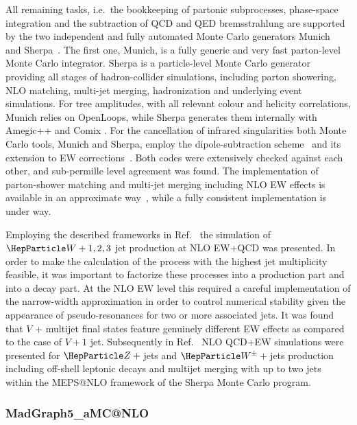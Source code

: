 \documentclass[11pt]{cernrep}
\begin{document}
All remaining tasks, i.e.\ the bookkeeping of partonic subprocesses,
phase-space integration and the subtraction of QCD and QED
bremsstrahlung are supported by the two independent and fully
automated Monte Carlo generators {\sc Munich}~\cite{munich} and {\sc
  Sherpa}~\cite{Gleisberg:2007md,Gleisberg:2008ta}.  The first one,
{\sc Munich}, is a fully generic and very fast parton-level Monte
Carlo integrator. {\sc Sherpa} is a particle-level Monte Carlo
generator providing all stages of hadron-collider simulations,
including parton showering, NLO matching, multi-jet merging,
hadronization and underlying event simulations.  For tree amplitudes,
with all relevant colour and helicity correlations, {\sc Munich}
relies on {\sc OpenLoops}, while {\sc Sherpa} generates them
internally with {\sc Amegic++} \cite{Krauss:2001iv} and {\sc Comix}
\cite{Gleisberg:2008fv}.
%
For the cancellation of infrared singularities both Monte Carlo tools,
{\sc Munich} and {\sc Sherpa}, employ the dipole-subtraction
scheme~\cite{Catani:1996vz,Catani:2002hc} and its extension to EW
corrections~\cite{Dittmaier:1999mb,Dittmaier:2008md}.  Both codes were
extensively checked against each other, and sub-permille level
agreement was found. The implementation of parton-shower matching and
multi-jet merging including NLO EW effects is available in an
approximate way~\cite{Kallweit:2015dum}, while a fully consistent
implementation is under way.

Employing the described frameworks in Ref.~\cite{Kallweit:2014xda} the
simulation of $\PW+1,2,3$ jet production at NLO EW+QCD was presented.
In order to make the calculation of the process with the highest jet
multiplicity feasible, it was important to factorize these processes
into a production part and into a decay part. At the NLO EW level this
required a careful implementation of the narrow-width approximation in
order to control numerical stability given the appearance of
pseudo-resonances for two or more associated jets. It was found that
$V$ + multijet final states feature genuinely different EW effects as
compared to the case of $V + 1$ jet. Subsequently in
Ref.~\cite{Kallweit:2015dum} NLO QCD+EW simulations were presented for
$\PZ+{}$jets and $\PW^{\pm}+{}$jets production including off-shell leptonic
decays and multijet merging with up to two jets within the MEPS@NLO
framework of the {\sc Sherpa} Monte Carlo program.


\subsubsection*{{\sc\small MadGraph5\_\-aMC@NLO}}
\end{document}
